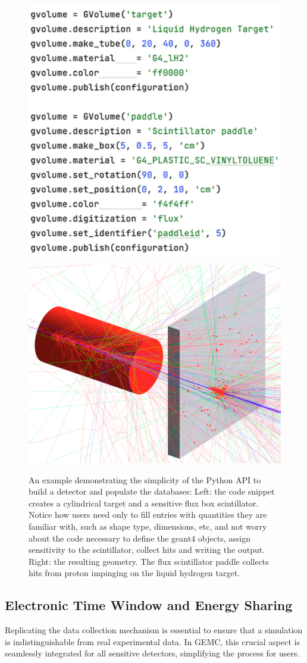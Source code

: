 \begin{figure}[h]
    \centering
    \includegraphics[width=.40\textwidth]{img/api_snippet}
    \includegraphics[width=.58\textwidth]{img/api}
    \caption{An example demonstrating the simplicity of the Python API to build a detector and populate the databases:
    Left: the code snippet creates a cylindrical target and a sensitive flux box scintillator.
    Notice how users need only to fill entries with
    quantities they are familiar with, such as shape type, dimensions, etc, and not
    worry about the code necessary to define the geant4 objects, assign sensitivity to the
    scintillator, collect hits and writing the output.
    Right: the resulting geometry. The flux scintillator paddle collects hits from proton
    impinging on the liquid hydrogen target.}
    \label{fig:api}
\end{figure}

\subsection{Electronic Time Window and Energy Sharing}
\label{subsec:time_window}

Replicating the data collection mechanism is essential to ensure that a simulation is
indistinguishable from real experimental data.
In GEMC, this crucial aspect is seamlessly integrated for all sensitive detectors,
simplifying the process for users.

